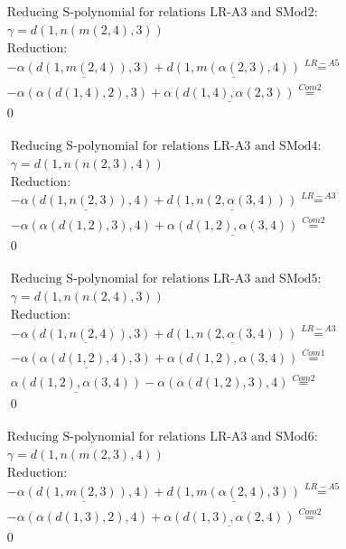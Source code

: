 \documentclass[11pt]{amsart}
\begin{document}
\begin{align*} 
& \text{Reducing S-polynomial for relations LR-A3 and SMod2:} \\ 
& \gamma = d(1,n(m(2,4),3)) \\ 
& \text{Reduction}: \\& - \underline{\alpha(d(1,m(2,4)),3)} + \underline{d(1,m(\alpha(2,3),4))} \stackrel{ LR-A5 }{=}  \\ 
& - \alpha(\alpha(d(1,4),2),3) + \underline{\alpha(d(1,4),\alpha(2,3))} \stackrel{ Com2 }{=}  \\ 
&0\\ 
\end{align*} 
 
\begin{align*} 
& \text{Reducing S-polynomial for relations LR-A3 and SMod4:} \\ 
& \gamma = d(1,n(n(2,3),4)) \\ 
& \text{Reduction}: \\& - \underline{\alpha(d(1,n(2,3)),4)} + \underline{d(1,n(2,\alpha(3,4)))} \stackrel{ LR-A3 }{=}  \\ 
& - \alpha(\alpha(d(1,2),3),4) + \underline{\alpha(d(1,2),\alpha(3,4))} \stackrel{ Com2 }{=}  \\ 
&0\\ 
\end{align*} 
 
\begin{align*} 
& \text{Reducing S-polynomial for relations LR-A3 and SMod5:} \\ 
& \gamma = d(1,n(n(2,4),3)) \\ 
& \text{Reduction}: \\& - \underline{\alpha(d(1,n(2,4)),3)} + \underline{d(1,n(2,\alpha(3,4)))} \stackrel{ LR-A3 }{=}  \\ 
& - \underline{\alpha(\alpha(d(1,2),4),3)} + \alpha(d(1,2),\alpha(3,4)) \stackrel{ Com1 }{=}  \\ 
&\underline{\alpha(d(1,2),\alpha(3,4))} - \alpha(\alpha(d(1,2),3),4) \stackrel{ Com2 }{=}  \\ 
&0\\ 
\end{align*} 
 
\begin{align*} 
& \text{Reducing S-polynomial for relations LR-A3 and SMod6:} \\ 
& \gamma = d(1,n(m(2,3),4)) \\ 
& \text{Reduction}: \\& - \underline{\alpha(d(1,m(2,3)),4)} + \underline{d(1,m(\alpha(2,4),3))} \stackrel{ LR-A5 }{=}  \\ 
& - \alpha(\alpha(d(1,3),2),4) + \underline{\alpha(d(1,3),\alpha(2,4))} \stackrel{ Com2 }{=}  \\ 
&0\\ 
\end{align*} 
 
\end{document}
